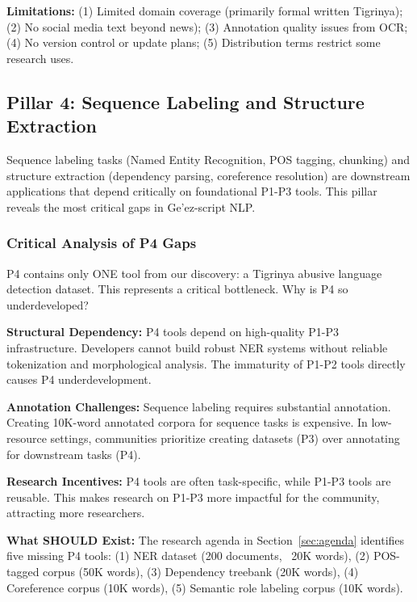 \documentclass[12pt,a4paper]{article}
\theoremstyle{plain}
\theoremstyle{definition}
\begin{document}
\textbf{Limitations:} (1) Limited domain coverage (primarily formal written Tigrinya); (2) No social media text beyond news); (3) Annotation quality issues from OCR; (4) No version control or update plans; (5) Distribution terms restrict some research uses.


\subsection{Pillar 4: Sequence Labeling and Structure Extraction}
\label{subsec:pillar4}

Sequence labeling tasks (Named Entity Recognition, POS tagging, chunking) and structure extraction (dependency parsing, coreference resolution) are downstream applications that depend critically on foundational P1-P3 tools. This pillar reveals the most critical gaps in Ge'ez-script NLP.

\subsubsection{Critical Analysis of P4 Gaps}

P4 contains only ONE tool from our discovery: a Tigrinya abusive language detection dataset. This represents a critical bottleneck. Why is P4 so underdeveloped?

\textbf{Structural Dependency:} P4 tools depend on high-quality P1-P3 infrastructure. Developers cannot build robust NER systems without reliable tokenization and morphological analysis. The immaturity of P1-P2 tools directly causes P4 underdevelopment.

\textbf{Annotation Challenges:} Sequence labeling requires substantial annotation. Creating 10K-word annotated corpora for sequence tasks is expensive. In low-resource settings, communities prioritize creating datasets (P3) over annotating for downstream tasks (P4).

\textbf{Research Incentives:} P4 tools are often task-specific, while P1-P3 tools are reusable. This makes research on P1-P3 more impactful for the community, attracting more researchers.

\textbf{What SHOULD Exist:} The research agenda in Section~\ref{sec:agenda} identifies five missing P4 tools: (1) NER dataset (200 documents, ~20K words), (2) POS-tagged corpus (50K words), (3) Dependency treebank (20K words), (4) Coreference corpus (10K words), (5) Semantic role labeling corpus (10K words).
\end{document}
